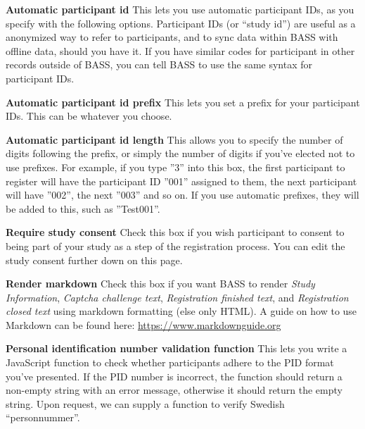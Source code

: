 \documentclass[
]{book}
\begin{document}
\textbf{Automatic participant id}
This lets you use automatic participant IDs, as you specify with the following options. Participant IDs (or ``study id'') are useful as a anonymized way to refer to participants, and to sync data within BASS with offline data, should you have it. If you have similar codes for participant in other records outside of BASS, you can tell BASS to use the same syntax for participant IDs.

\textbf{Automatic participant id prefix}
This lets you set a prefix for your participant IDs. This can be whatever you choose.

\textbf{Automatic participant id length}
This allows you to specify the number of digits following the prefix, or simply the number of digits if you've elected not to use prefixes. For example, if you type ''3'' into this box, the first participant to register will have the participant ID ''001'' assigned to them, the next participant will have ''002'', the next ''003'' and so on. If you use automatic prefixes, they will be added to this, such as ''Test001''.

\textbf{Require study consent}
Check this box if you wish participant to consent to being part of your study as a step of the registration process. You can edit the study consent further down on this page.

\textbf{Render markdown}
Check this box if you want BASS to render \emph{Study Information}, \emph{Captcha challenge text}, \emph{Registration finished text}, and \emph{Registration closed text} using markdown formatting (else only HTML). A guide on how to use Markdown can be found here: \url{https://www.markdownguide.org}

\textbf{Personal identification number validation function}
This lets you write a JavaScript function to check whether participants adhere to the PID format you've presented. If the PID number is incorrect, the function should return a non-empty string with an error message, otherwise it should return the empty string. Upon request, we can supply a function to verify Swedish ``personnummer''.
\end{document}
